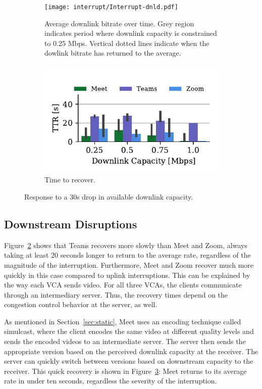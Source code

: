 \begin{figure}[t!]
 \centering
\begin{subfigure}[t]{.5\textwidth}
   \centering
    \texttt{[image: interrupt/Interrupt-dnld.pdf]}
    \caption{Average downlink bitrate over time. Grey region indicates period where downlink capacity is constrained to 0.25 Mbps. Vertical dotted lines indicate when the dowlink bitrate has returned to the average.}
    \label{fig:ts-dnld}
\end{subfigure}
\begin{subfigure}[t]{.5\textwidth}
  \centering
    \includegraphics[width=.9\textwidth,keepaspectratio]{figures/interrupt/TTR-dnld.pdf}
    \caption{Time to recover.}
    \label{fig:TTR_dnld}
\end{subfigure}
\caption{Response to a 30s drop in available downlink capacity.}
\label{fig:interrupt-dnld}
\end{figure}

\subsection{Downstream Disruptions}

Figure~\ref{fig:TTR_dnld} shows that Teams recovers more slowly than Meet and
Zoom, always taking at least 20 seconds longer to return to the average rate,
regardless of the magnitude of the interruption. Furthermore, Meet and Zoom
recover much more quickly in this case compared to uplink interruptions. This
can be explained by the way each VCA sends video. For all three VCAs, the
clients communicate through an intermediary server. Thus, the recovery times
depend on the congestion control behavior at the server, as well. 

As mentioned in Section~\ref{sec:static}, Meet uses an encoding technique
called simulcast, where the client encodes the same video at different quality
levels and sends the encoded videos to an intermediate server. The server then
sends the appropriate version based on the perceived downlink capacity at the
receiver. The server can quickly switch between versions based on downstream
capacity to the receiver. This quick recovery is shown in
Figure~\ref{fig:interrupt-dnld}: Meet returns to its average rate in under ten
seconds, regardless the severity of the interruption.

